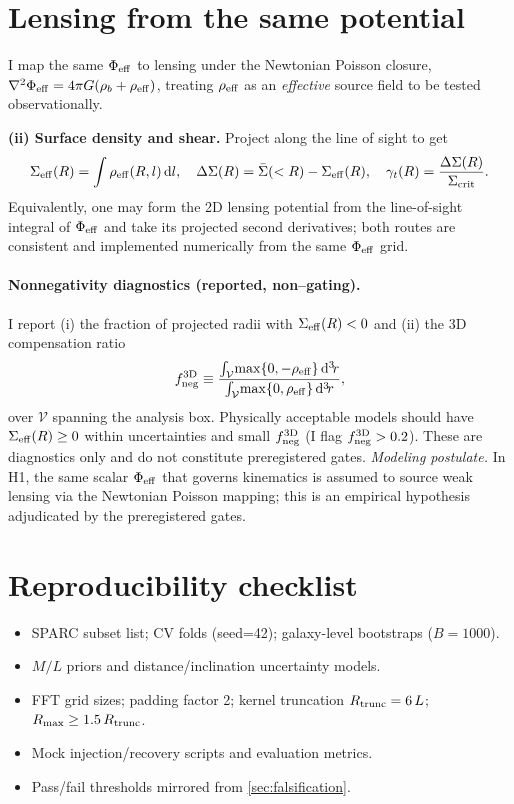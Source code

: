 		\section{Lensing from the same potential}\label{app:lensing}
I map the same $\Phi_{\rm eff}$ to lensing under the Newtonian Poisson closure,
$\nabla^2\Phi_{\rm eff}=4\pi G(\rho_b+\rho_{\rm eff})$,
treating $\rho_{\rm eff}$ as an \emph{effective} source field to be tested observationally.
		
		\textbf{(ii) Surface density and shear.} Project along the line of sight to get
		\[
		\Sigma_{\rm eff}(R)=\int \rho_{\rm eff}(R,l)\,\mathrm{d} l,\quad
		\Delta\Sigma(R)=\bar{\Sigma}(<R)-\Sigma_{\rm eff}(R),\quad
		\gamma_t(R)=\frac{\Delta\Sigma(R)}{\Sigma_{\rm crit}}.
		\]
		Equivalently, one may form the 2D lensing potential from the line-of-sight integral of $\Phi_{\mathrm{eff}}$ and take its projected second derivatives; both routes are consistent and implemented numerically from the same $\Phi_{\mathrm{eff}}$ grid.
\paragraph{Nonnegativity diagnostics (reported, non--gating).}
I report (i) the fraction of projected radii with $\Sigma_{\rm eff}(R)<0$ and (ii) the 3D compensation ratio
\[
f_{\rm neg}^{\rm 3D} \equiv \frac{\int_{\mathcal V}\!\max\{0,-\rho_{\rm eff}\}\,{\rm d}^3\!r}
{\int_{\mathcal V}\!\max\{0,\rho_{\rm eff}\}\,{\rm d}^3\!r},
\]
over $\mathcal V$ spanning the analysis box. Physically acceptable models should have $\Sigma_{\rm eff}(R)\ge 0$ within uncertainties and small $f_{\rm neg}^{\rm 3D}$ (I flag $f_{\rm neg}^{\rm 3D}>0.2$). These are diagnostics only and do not constitute preregistered gates.
\noindent\textit{Modeling postulate.} In H1, the same scalar $\Phi_{\rm eff}$ that governs kinematics is assumed to source weak lensing via the Newtonian Poisson mapping; this is an empirical hypothesis adjudicated by the preregistered gates.

		\section{Reproducibility checklist}\label{app:reprod}
		\begin{itemize}
			\item SPARC subset list; CV folds (seed=42); galaxy-level bootstraps ($B=1000$).
			\item $M/L$ priors and distance/inclination uncertainty models.
			\item FFT grid sizes; padding factor 2; kernel truncation $R_{\rm trunc}=6\,L$; $R_{\max}\ge 1.5\,R_{\rm trunc}$.
			\item Mock injection/recovery scripts and evaluation metrics.
			\item Pass/fail thresholds mirrored from \cref{sec:falsification}.
		\end{itemize}
		
		
		
		
	
